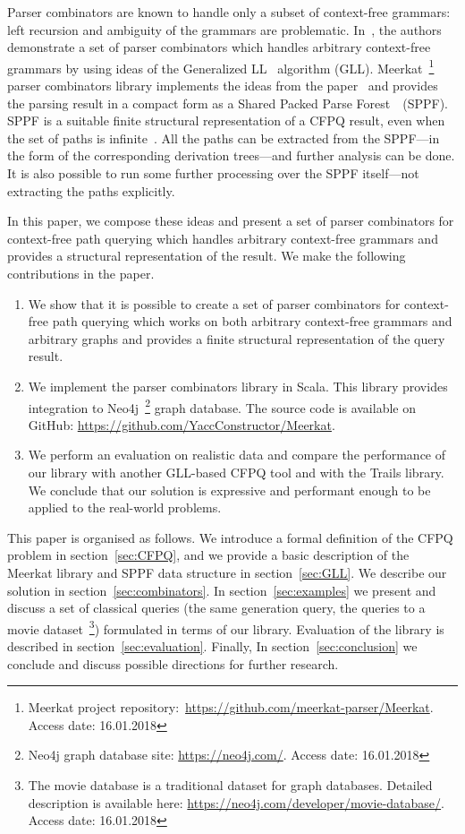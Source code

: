 Parser combinators are known to handle only a subset of context-free grammars: left recursion and ambiguity of the grammars are problematic.
In~\cite{Meerkat}, the authors demonstrate a set of parser combinators which handles arbitrary context-free grammars by using ideas of the Generalized LL~\cite{scott2010gll} algorithm (GLL).
Meerkat~\footnote{Meerkat project repository:~\url{https://github.com/meerkat-parser/Meerkat}. Access date: 16.01.2018} parser combinators library implements the ideas from the paper~\cite{Meerkat} and provides the parsing result in a compact form as a Shared Packed Parse Forest~\cite{SPPF}~(SPPF).
SPPF is a suitable finite structural representation of a CFPQ result, even when the set of paths is infinite~\cite{GrigorevR16}.
All the paths can be extracted from the SPPF---in the form of the corresponding derivation trees---and further analysis can be done.
It is also possible to run some further processing over the SPPF itself---not extracting the paths explicitly.

In this paper, we compose these ideas and present a set of parser combinators for context-free path querying which handles arbitrary context-free grammars and provides a structural representation of the result.
We make the following contributions in the paper.

\begin{enumerate}
\item We show that it is possible to create a set of parser combinators for context-free path querying which works on both arbitrary context-free grammars and arbitrary graphs and provides a finite structural representation of the query result.
\item We implement the parser combinators library in Scala. This library provides integration to Neo4j~\footnote{Neo4j graph database site: \url{https://neo4j.com/}. Access date: 16.01.2018} graph database. The source code is available on GitHub: \url{https://github.com/YaccConstructor/Meerkat}.
\item We perform an evaluation on realistic data and compare the performance of our library with another GLL-based CFPQ tool and with the Trails library.
We conclude that our solution is expressive and performant enough to be applied to the real-world problems.
\end{enumerate}

This paper is organised as follows.
We introduce a formal definition of the CFPQ problem in section~\ref{sec:CFPQ}, and we provide a basic description of the Meerkat library and SPPF data structure in section~\ref{sec:GLL}.
We describe our solution in section~\ref{sec:combinators}.
In section~\ref{sec:examples} we present and discuss a set of classical queries (the same generation query, the queries to a movie dataset~\footnote{The movie database is a traditional dataset for graph databases. Detailed description is available here: \url{https://neo4j.com/developer/movie-database/}. Access date: 16.01.2018})
formulated in terms of our library.
Evaluation of the library is described in section~\ref{sec:evaluation}.
Finally, In section~\ref{sec:conclusion} we conclude and discuss possible directions for further research.
